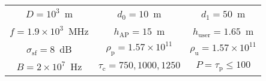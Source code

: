 \begin{tabular}{ccc}
\hline
$D=10^3$~m & $d_0=10$~m & $d_1=50$~m \\
$f=1.9\times 10^3$~MHz & $h_\mathrm{AP}=15$~m & $h_\mathrm{user}=1.65$~m \\
$\sigma_\mathrm{sf}=8$~dB & $\rho_\mathrm{p}=1.57\times 10^{11}$ & $\rho_\mathrm{u}=1.57\times 10^{11}$ \\
$B=2\times 10^7$~Hz & $\tau_\mathrm{c}=750,1000,1250$ & $P=\tau_\mathrm{p}\le 100$ \\
\hline
\end{tabular}
